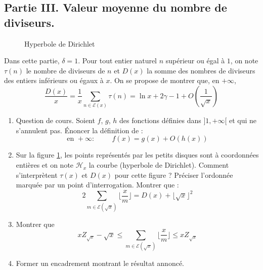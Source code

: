 \subsection*{Partie III. Valeur moyenne du nombre de diviseurs.}
\begin{figure}
 \centering
 
 \caption{Hyperbole de Dirichlet}
 \label{fig:Ethean_1}
\end{figure}

Dans cette partie, $\delta=1$. Pour tout entier naturel $n$ supérieur ou égal à $1$, on note $\tau(n)$ le nombre de diviseurs de $n$ et $D(x)$ la somme des nombres de diviseurs des entiers inférieurs ou égaux à $x$. On se propose de montrer que, en $+\infty$,
\begin{displaymath}
 \frac{D(x)}{x}=\frac{1}{x}\sum_{n\in \mathcal E(x)}\tau(n) = \ln x +2\gamma -1 +O(\frac{1}{\sqrt{x}})
\end{displaymath}
\begin{enumerate}
\item Question de cours.\newline
Soient $f$, $g$, $h$ des fonctions définies dans $]1,+\infty[$ et qui ne s'annulent pas. \'Enoncer la définition de :
\begin{displaymath}
 \text{en }+\infty:\hspace{1cm}f(x)=g(x)+O(h(x))
\end{displaymath}
 
\item Sur la figure \ref{fig:Ethean_1}, les points représentés  par les petits disques sont à coordonnées entières et on note $\mathcal{H}_x$ la courbe (hyperbole de Dirichlet). Comment s'interprètent $\tau(x)$ et $D(x)$ pour cette figure ? Préciser l'ordonnée marquée par un point d'interrogation.\newline
Montrer que :
\begin{displaymath}
 2\sum_{m\in \mathcal E(\sqrt{x})}\lfloor \frac{x}{m}\rfloor = D(x) +\lfloor\sqrt{x}\rfloor ^2
\end{displaymath}
\item Montrer que 
\begin{displaymath}
 xZ_{\sqrt{x}}-\sqrt{x} \leq \sum_{m\in \mathcal E(\sqrt{x})}\lfloor \frac{x}{m}\rfloor \leq x Z_{\sqrt{x}}
\end{displaymath}
\item Former un encadrement montrant le résultat annoncé.
\end{enumerate}

